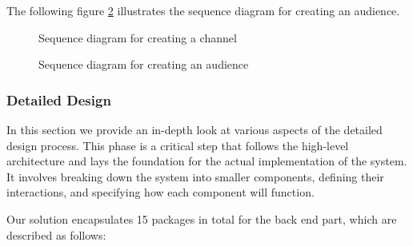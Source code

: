 \noindent The following figure \ref{seq-create-audience} illustrates the sequence diagram for creating an audience.

\begin{landscape}
    \begin{figure}[hbt!]
        \centering
        
        \caption{Sequence diagram for creating a channel}
        \label{seq-create-channel}
    \end{figure}
\end{landscape}

\begin{landscape}
    \begin{figure}[hbt!]
        \centering
        
        \caption{Sequence diagram for creating an audience}
        \label{seq-create-audience}
    \end{figure}
\end{landscape}

\subsubsection{Detailed Design}
In this section we provide an in-depth look at various aspects of the detailed design process.
This phase is a critical step that follows the high-level architecture and lays the foundation
for the actual implementation of the system. It involves breaking down the system into smaller
components, defining their interactions, and specifying how each component will function.

\noindent Our solution encapsulates 15 packages in total for the back end part, which are described as follows:

